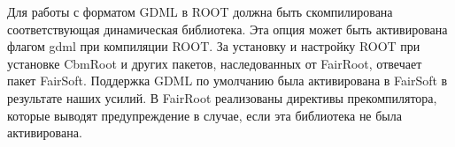 Для работы с форматом GDML в ROOT должна быть скомпилирована соответствующая динамическая библиотека.
Эта опция может быть активирована флагом gdml при компиляции ROOT.
За установку и настройку ROOT при установке CbmRoot и других пакетов, наследованных от FairRoot, отвечает пакет FairSoft.
Поддержка GDML по умолчанию была активирована в FairSoft \todo в результате наших усилий.
В FairRoot реализованы директивы прекомпилятора, которые выводят предупреждение в случае, если эта библиотека не была активирована.

%
%
%







